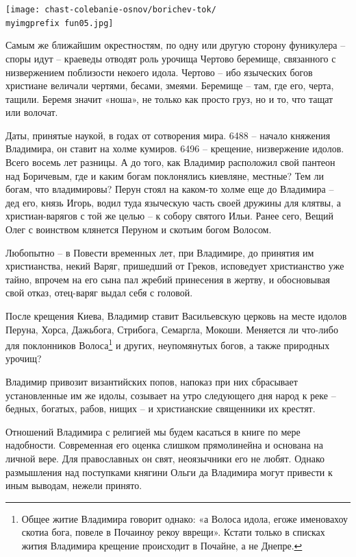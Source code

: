 \begin{center}
\texttt{[image: chast-colebanie-osnov/borichev-tok/\\myimgprefix fun05.jpg]}
\end{center}

Самым же ближайшим окрестностям, по одну или другую сторону фуникулера – споры идут – краеведы отводят роль урочища Чертово беремище, связанного с низвержением поблизости некоего идола. Чертово – ибо языческих богов христиане величали чертями, бесами, змеями. Беремище – там, где его, черта, тащили. Беремя значит «ноша», не только как просто груз, но и то, что тащат или волочат.

Даты, принятые наукой, в годах от сотворения мира. 6488 – начало княжения Владимира, он ставит на холме кумиров. 6496 – крещение, низвержение идолов. Всего восемь лет разницы. А до того, как Владимир расположил свой пантеон над Боричевым, где и каким богам поклонялись киевляне, местные? Тем ли богам, что владимировы? Перун стоял на каком-то холме еще до Владимира – дед его, князь Игорь, водил туда языческую часть своей дружины для клятвы, а христиан-варягов с той же целью – к собору святого Ильи. Ранее сего, Вещий Олег с воинством клянется Перуном и скотьим богом Волосом.

Любопытно – в Повести временных лет, при Владимире, до принятия им христианства, некий Варяг, пришедший от Греков, исповедует христианство уже тайно, впрочем на его сына пал жребий принесения в жертву, и обосновывая свой отказ, отец-варяг выдал себя с головой.

После крещения Киева, Владимир ставит Васильевскую церковь на месте идолов Перуна, Хорса, Дажьбога, Стрибога, Семаргла, Мокоши. Меняется ли что-либо для поклонников Волоса\footnote{Общее житие Владимира говорит однако: «а Волоса идола, егоже именовахоу скотиа бога, повеле в Почаиноу рекоу вврещи». Кстати только в списках жития Владимира крещение происходит в Почайне, а не Днепре.} и других, неупомянутых богов, а также природных урочищ?

Владимир привозит византийских попов, напоказ при них сбрасывает установленные им же идолы, созывает на утро следующего дня народ к реке – бедных, богатых, рабов, нищих – и христианские священники их крестят.
 
Отношений Владимира с религией мы будем касаться в книге по мере надобности. Современная его оценка слишком прямолинейна и основана на личной вере. Для православных он свят, неоязычники его не любят. Однако размышления над поступками княгини Ольги да Владимира могут привести к иным выводам, нежели принято.

